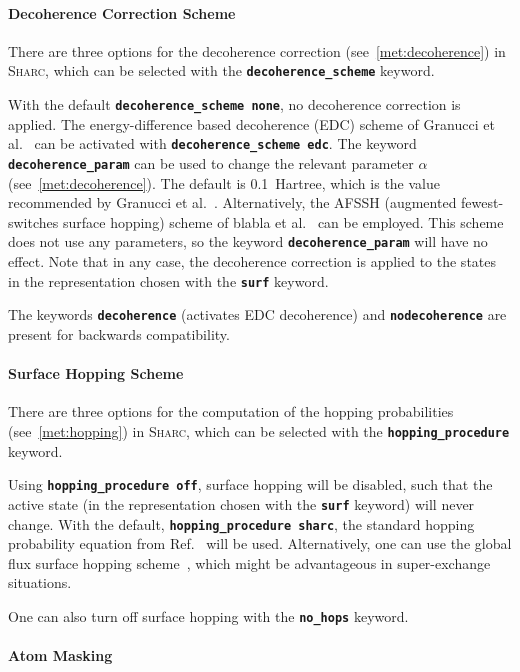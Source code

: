 \documentclass[a4paper,10pt,DIV=15,openany,twoside=false]{scrbook}
\newcommand{\sharc}{\textsc{Sharc}}
\newcommand{\todo}[1]{\textcolor{RL}{#1}}
\newcommand{\ttt}[1]{\textbf{\texttt{#1}}}
\begin{document}
\paragraph{Decoherence Correction Scheme}

There are three options for the decoherence correction (see~\ref{met:decoherence}) in \sharc, which can be selected with the \ttt{decoherence\_scheme} keyword. 

With the default \ttt{decoherence\_scheme none}, no decoherence correction is applied.
The energy-difference based decoherence (EDC) scheme of Granucci et al.~\cite{Granucci2010JCP} can be activated with \ttt{decoherence\_scheme edc}. 
The keyword \ttt{decoherence\_param} can be used to change the relevant parameter $\alpha$ (see~\ref{met:decoherence}). The default is 0.1~Hartree, which is the value recommended by Granucci et al.~\cite{Granucci2010JCP}.
Alternatively, the AFSSH (augmented fewest-switches surface hopping) scheme of \todo{blabla et al.}~\cite{??} can be employed. This scheme does not use any parameters, so the keyword \ttt{decoherence\_param} will have no effect.
Note that in any case, the decoherence correction is applied to the states in the representation chosen with the \ttt{surf} keyword.

The keywords \ttt{decoherence} (activates EDC decoherence) and \ttt{nodecoherence} are present for backwards compatibility.

\paragraph{Surface Hopping Scheme}

There are three options for the computation of the hopping probabilities (see~\ref{met:hopping}) in \sharc, which can be selected with the \ttt{hopping\_procedure} keyword. 

Using \ttt{hopping\_procedure off}, surface hopping will be disabled, such that the active state (in the representation chosen with the \ttt{surf} keyword) will never change.
With the default, \ttt{hopping\_procedure sharc}, the standard hopping probability equation from Ref.~\cite{Mai2015IJQC} will be used.
Alternatively, one can use the global flux surface hopping scheme~\cite{??}, which might be advantageous in super-exchange situations.

One can also turn off surface hopping with the \ttt{no\_hops} keyword.

\paragraph{Atom Masking}
\end{document}
